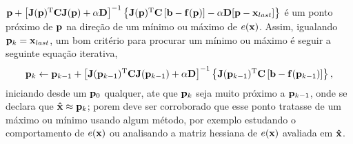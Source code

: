\begin{myproofT}
$\VECTOR{p} +
\left[ \MATRIX{J}(\VECTOR{p})^{\transpose}\MATRIX{C} \MATRIX{J}(\VECTOR{p})+\alpha \MATRIX{D} \right]^{-1}
\left\{ \MATRIX{J}(\VECTOR{p})^{\transpose}\MATRIX{C} \left[\VECTOR{b}-\VECTOR{f}(\VECTOR{p})\right]-\alpha\MATRIX{D}[\VECTOR{p}-\VECTOR{x}_{last}]\right\}$
é um ponto próximo de $\VECTOR{p}$  na direção de um mínimo ou máximo de $ e(\VECTOR{x})$.
Assim, igualando $\VECTOR{p}_{k}=\VECTOR{x}_{last}$,  um bom critério para procurar um mínimo ou máximo é seguir a seguinte 
equação iterativa,
\begin{equation}\label{eq:proof:minfxbCfxbaxod3}
 \VECTOR{p}_{k} \leftarrow \VECTOR{p}_{k-1} +
\left[ \MATRIX{J}(\VECTOR{p}_{k-1})^{\transpose}\MATRIX{C} \MATRIX{J}(\VECTOR{p}_{k-1})+\alpha \MATRIX{D} \right]^{-1}
\left\{ \MATRIX{J}(\VECTOR{p}_{k-1})^{\transpose}\MATRIX{C} \left[\VECTOR{b}-\VECTOR{f}(\VECTOR{p}_{k-1})\right] \right\},
\end{equation}
iniciando desde um $\VECTOR{p}_{0}$ qualquer, ate que $\VECTOR{p}_{k}$ seja muito próximo a $\VECTOR{p}_{k-1}$,
onde se declara que $\VECTOR{\hat{x}} \approx \VECTOR{p}_{k}$; porem deve ser corroborado
que esse ponto tratasse de um máximo ou mínimo usando algum método, por exemplo estudando o comportamento 
de $e(\VECTOR{x})$ ou analisando a matriz hessiana de $e(\VECTOR{x})$ avaliada em $\VECTOR{\hat{x}}$.
\end{myproofT}
